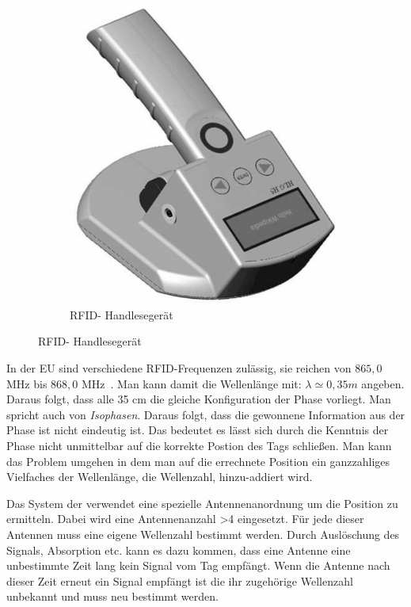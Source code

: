\begin{figure} [h!]
%         
\qquad
%
         \begin{subfigure}[h]{0.4\textwidth}
                 \centering
                 \includegraphics[width=\textwidth]{img/RFID-Reader_gs.png}
                 \vspace{.1cm}
                 \caption{RFID- Handlesegerät }
                 \label{fig:READER}
         \end{subfigure}
\end{figure}
%
\label{sec:Measurement1}
%
%

In der EU sind verschiedene RFID-Frequenzen zulässig, sie reichen von $865,0$ MHz bis $868,0$ MHz~\cite{etsi1}. Man kann damit die Wellenlänge mit: $ \lambda\simeq0,35 m $ angeben. Daraus folgt, dass alle 35 cm die gleiche Konfiguration der Phase vorliegt. Man spricht auch von \textit{Isophasen}. Daraus folgt, dass die gewonnene Information aus der Phase ist nicht eindeutig ist. Das bedeutet es lässt sich durch die Kenntnis der Phase nicht unmittelbar auf die korrekte Postion des Tags schließen. Man kann das Problem umgehen in dem man auf die errechnete Position ein ganzzahliges Vielfaches der Wellenlänge, die Wellenzahl, hinzu-addiert wird.
%

Das System der \amedogmbh verwendet eine spezielle Antennenanordnung um die Position zu ermitteln. Dabei wird eine Antennenanzahl >4 eingesetzt. Für jede dieser Antennen muss eine eigene Wellenzahl bestimmt werden. Durch Auslöschung des Signals, Absorption etc. kann es dazu kommen, dass eine Antenne eine unbestimmte Zeit lang kein Signal vom Tag empfängt. Wenn die Antenne nach dieser Zeit erneut ein Signal empfängt ist die ihr zugehörige Wellenzahl unbekannt und muss neu bestimmt werden. \\
%

